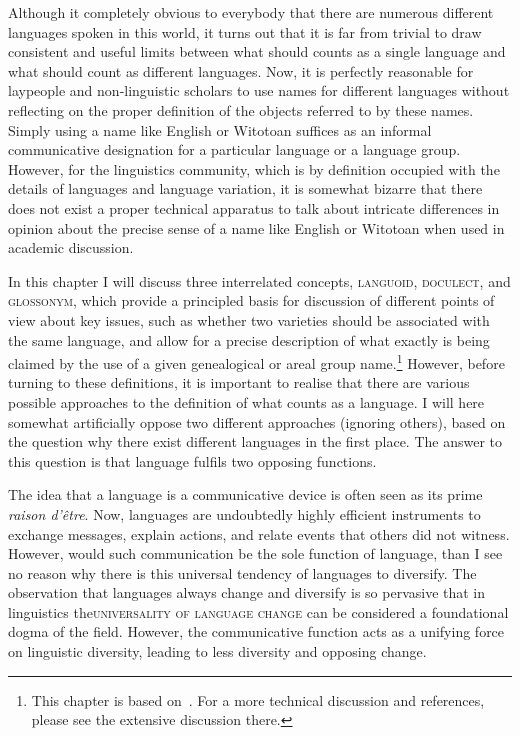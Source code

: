 \label{ch:language}

Although it completely obvious to everybody that there are numerous different languages spoken in this world, it turns out that it is far from trivial to draw consistent and useful limits between what should counts as a single language and what should count as different languages. Now, it is perfectly reasonable for laypeople and non-linguistic scholars to use names for different languages without reflecting on the proper definition of the objects referred to by these names. Simply using a name like English or Witotoan suffices as an informal communicative designation for a particular language or a language group. However, for the linguistics community, which is by definition occupied with the details of languages and language variation, it is somewhat bizarre that there does not exist a proper technical apparatus to talk about intricate differences in opinion about the precise sense of a name like English or Witotoan when used in academic discussion. 

In this chapter I will discuss three interrelated concepts, \textsc{languoid}, \textsc{doculect}, and \textsc{glossonym}, which provide a principled basis for discussion of different points of view about key issues, such as whether two varieties should be associated with the same language, and allow for a precise description of what exactly is being claimed by the use of a given genealogical or areal group name.\footnote{This chapter is based on~\citet{cysouwgood2013}. For a more technical discussion and references, please see the extensive discussion there.} However, before turning to these definitions, it is important to realise that there are various possible approaches to the definition of what counts as a language. I will here somewhat artificially oppose two different approaches (ignoring others), based on the question why there exist different languages in the first place. The answer to this question is that language fulfils two opposing functions.

%
The idea that a language is a communicative device is often seen as its prime \textit{raison d'être}. Now, languages are undoubtedly highly efficient instruments to exchange messages, explain actions, and relate events that others did not witness. However, would such communication be the sole function of language, than I see no reason why there is this universal tendency of languages to diversify. The observation that languages always change and diversify is so pervasive that in linguistics the\textsc{universality of language change} can be considered a foundational dogma of the field. However, the communicative function acts as a unifying force on linguistic diversity, leading to less diversity and opposing change. 

